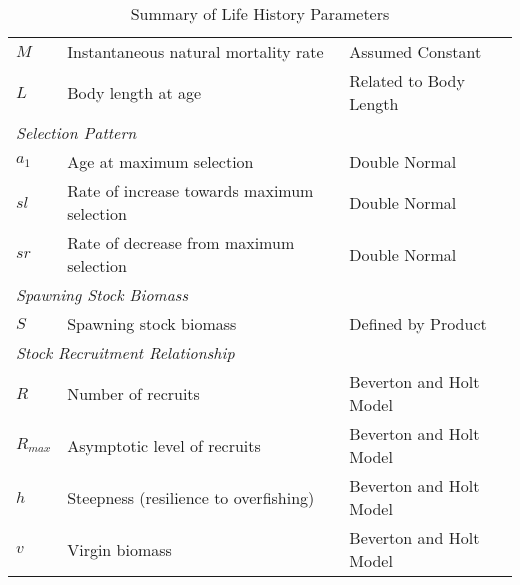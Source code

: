 \begin{table}[ht]
\begin{tabular}{lll}
\(M\)                     & Instantaneous natural mortality rate                                                                   & Assumed Constant                  \\
\(L\)                     & Body length at age                                                                                     & Related to Body Length            \\ \hline
\multicolumn{3}{l}{\textit{Selection Pattern}}                                                                                      \\
\(a_1\)                   & Age at maximum selection                                                                                & Double Normal                     \\
\(sl\)                    & Rate of increase towards maximum selection                                                             & Double Normal                     \\
\(sr\)                    & Rate of decrease from maximum selection                                                                & Double Normal                     \\ \hline
\multicolumn{3}{l}{\textit{Spawning Stock Biomass}}                                                                                 \\
\(S\)                     & Spawning stock biomass                                                                                 & Defined by Product                \\ \hline
\multicolumn{3}{l}{\textit{Stock Recruitment Relationship}}                                                                         \\
\(R\)                     & Number of recruits                                                                                     & Beverton and Holt Model           \\
\(R_{max}\)               & Asymptotic level of recruits                                                                           & Beverton and Holt Model           \\
\(h\)                     & Steepness (resilience to overfishing)                                                                  & Beverton and Holt Model           \\
\(v\)                     & Virgin biomass                                                                                         & Beverton and Holt Model           \\ \hline
\end{tabular}
\caption{Summary of Life History Parameters}
\label{tab:life_history_parameters}
\end{table}

